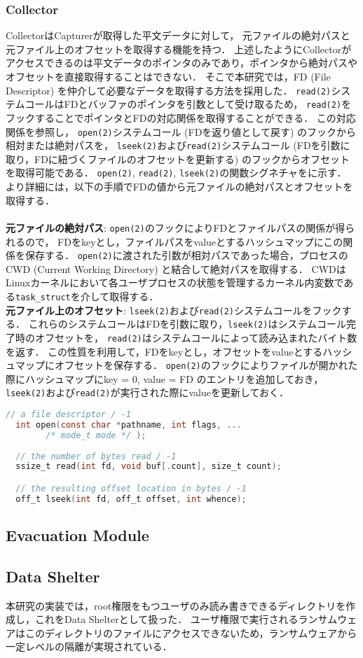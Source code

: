 \subsubsection{Collector}
CollectorはCapturerが取得した平文データに対して，
元ファイルの絶対パスと元ファイル上のオフセットを取得する機能を持つ．
上述したようにCollectorがアクセスできるのは平文データのポインタのみであり，ポインタから絶対パスやオフセットを直接取得することはできない．
そこで本研究では，FD (File Descriptor) を仲介して必要なデータを取得する方法を採用した．
\texttt{read(2)}システムコールはFDとバッファのポインタを引数として受け取るため，
\texttt{read(2)}をフックすることでポインタとFDの対応関係を取得することができる．
この対応関係を参照し，
\texttt{open(2)}システムコール (FDを返り値として戻す) のフックから相対または絶対パスを，
\texttt{lseek(2)}および\texttt{read(2)}システムコール (FDを引数に取り，FDに紐づくファイルのオフセットを更新する) のフックからオフセットを取得可能である．
\texttt{open(2)}, \texttt{read(2)}, \texttt{lseek(2)}の関数シグネチャをに示す．
より詳細には，以下の手順でFDの値から元ファイルの絶対パスとオフセットを取得する．
\\
\\
\textbf{元ファイルの絶対パス}:
\texttt{open(2)}のフックによりFDとファイルパスの関係が得られるので，
FDをkeyとし，ファイルパスをvalueとするハッシュマップにこの関係を保存する．
\texttt{open(2)}に渡された引数が相対パスであった場合，プロセスのCWD (Current Working Directory) と結合して絶対パスを取得する．
CWDはLinuxカーネルにおいて各ユーザプロセスの状態を管理するカーネル内変数である\texttt{task\_struct}を介して取得する．
\\
\textbf{元ファイル上のオフセット}:
\texttt{lseek(2)}および\texttt{read(2)}システムコールをフックする．
これらのシステムコールはFDを引数に取り，\texttt{lseek(2)}はシステムコール完了時のオフセットを，
\texttt{read(2)}はシステムコールによって読み込まれたバイト数を返す．
この性質を利用して，FDをkeyとし，オフセットをvalueとするハッシュマップにオフセットを保存する．
\texttt{open(2)}のフックによりファイルが開かれた際にハッシュマップにkey = 0, value = FD のエントリを追加しておき，
\texttt{lseek(2)}および\texttt{read(2)}が実行された際にvalueを更新しておく．

\begin{lstlisting}[caption=Signatures of the related system calls. The comment lines indicate the return value on success / error., label=code:syscalls, language=C]
  // a file descriptor / -1
  int open(const char *pathname, int flags, ...
        /* mode_t mode */ );
        
  // the number of bytes read / -1
  ssize_t read(int fd, void buf[.count], size_t count);

  // the resulting offset location in bytes / -1
  off_t lseek(int fd, off_t offset, int whence);
\end{lstlisting}


\subsection{Evacuation Module}
\subsection{Data Shelter}
本研究の実装では，root権限をもつユーザのみ読み書きできるディレクトリを作成し，これをData Shelterとして扱った．
ユーザ権限で実行されるランサムウェアはこのディレクトリのファイルにアクセスできないため，ランサムウェアから一定レベルの隔離が実現されている．
